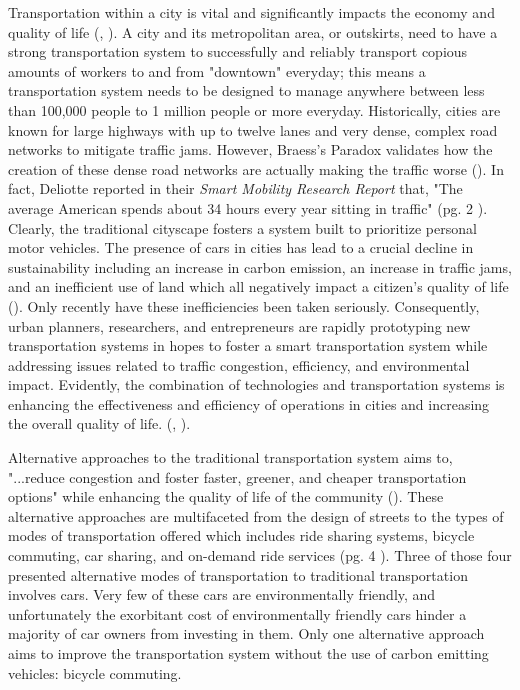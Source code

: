 \documentclass[12pt]{article}
\begin{document}
 Transportation within a city is vital and significantly impacts the economy and quality of life (\cite{dávalos_maldonado_polit_2016}, \cite{zuluaga_garcía_2017}). A city and its metropolitan area, or outskirts, need to have a strong transportation system to successfully and reliably transport copious amounts of workers to and from "downtown" everyday; this means a transportation system needs to be designed to manage anywhere between less than 100,000 people to 1 million people or more everyday. Historically, cities are known for large highways with up to twelve lanes and very dense, complex road networks to mitigate traffic jams. However, Braess's Paradox validates how the creation of these dense road networks are actually making the traffic worse (\cite{wikipedia_2020}). In fact, Deliotte reported in their \textit{Smart Mobility Research Report} that, "The average American spends about 34 hours every year sitting in traffic" (pg. 2 \cite{DeliotteReport}). Clearly, the traditional cityscape fosters a system built to prioritize personal motor vehicles. The presence of cars in cities has lead to a crucial decline in sustainability including an increase in carbon emission, an increase in traffic jams, and an inefficient use of land which all negatively impact a citizen's quality of life (\cite{dávalos_maldonado_polit_2016}). Only recently have these inefficiencies been taken seriously. Consequently, urban planners, researchers, and entrepreneurs are rapidly prototyping new transportation systems in hopes to foster a smart transportation system while addressing issues related to traffic congestion, efficiency, and environmental impact. Evidently, the combination of technologies and transportation systems is enhancing the effectiveness and efficiency of operations in cities and increasing the overall quality of life.  (\cite{montoya2017acceso}, \cite{dávalos_maldonado_polit_2016}).

Alternative approaches to the traditional transportation system aims to, "...reduce congestion and foster faster, greener, and cheaper transportation options" while enhancing the quality of life of the community (\cite{DeliotteReport}). These alternative approaches are multifaceted from the design of streets to the types of modes of transportation offered which includes ride sharing systems, bicycle commuting, car sharing, and on-demand ride services (pg. 4 \cite{DeliotteReport}). Three of those four presented alternative modes of transportation to traditional transportation involves cars. Very few of these cars are environmentally friendly, and unfortunately the exorbitant cost of environmentally friendly cars hinder a majority of car owners from investing in them. Only one alternative approach aims to improve the transportation system without the use of carbon emitting vehicles: bicycle commuting. 
\end{document}
